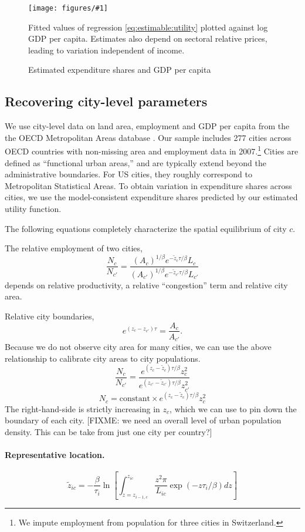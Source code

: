 \documentclass[12pt]{article}
\newcommand{\dofigure}[3]{\begin{figure}
\begin{centering}
\texttt{[image: figures/\#1]}
  \caption{#2\label{fig:#1}}
\end{centering}

\noindent \footnotesize{#3}
\end{figure}}
\begin{document}
\dofigure{city_level_inputs/expenditure_shares}{Estimated expenditure shares and GDP per capita}{Fitted values of regression \eqref{eq:estimable:utility} plotted against log GDP per capita. Estimates also depend on sectoral relative prices, leading to variation independent of income.}

\subsection{Recovering city-level parameters}
We use city-level data on land area, employment and GDP per capita from the the OECD Metropolitan Areas database \cite{oecd}. Our sample includes 277 cities across OECD countries with non-missing area and employment data in 2007.\footnote{We impute employment from population for three cities in Switzerland.} Cities are defined as ``functional urban areas,'' and are typically extend beyond the administrative boundaries. For US cities, they roughly correspond to Metropolitan Statistical Areas. To obtain variation in expenditure shares across cities, we use the model-consistent expenditure shares predicted by our estimated utility function.

The following equations completely characterize the spatial equilibrium of city $c$.



The relative employment of two cities,
\[
\frac{N_c}{N_{c'}}
= \frac
	 {\left(A_c\right)^{1/\beta} e^{-\tilde z_c{\tau/\beta}} L_{c}}
	 {\left(A_{c'}\right)^{1/\beta} e^{-\tilde z_{c'}{\tau/\beta}} L_{c'}}
\]
depends on relative productivity, a relative ``congestion'' term and relative city area.

Relative city boundaries,
\[
e^{(z_{c}-z_{c'}) \tau} =
\frac {A_c}
	{A_{c'}}.
\]
Because we do not observe city area for many cities, we can use the above relationship to calibrate city areas to city populations.
\[
\frac{N_c}{N_{c'}}
= \frac
	 {e^{(z_c-\tilde z_c){\tau/\beta}} z_{c}^2}
	 {e^{(z_{c'}-\tilde z_{c'}){\tau/\beta}} z_{c'}^2}
\]
\[
{N_c}
= \text{constant} \times {e^{(z_c-\tilde z_c){\tau/\beta}} z_{c}^2}
\]
The right-hand-side is strictly increasing in $z_c$, which we can use to pin down the boundary of each city.
[FIXME: we need an overall level of urban population density. This can be take from just one city per country?]


\paragraph{Representative location.}
\begin{equation}\label{eq:representative_location}
	\tilde z_{ic}
	=
	- \frac {\beta}{\tau_i}
	\ln
	\left[
	\int_{z=z_{i-1,c}}^{z_{ic}}
		\frac {z^2\pi}{L_{ic}}
		\exp(-z \tau_i/\beta)
		dz
	\right]
\end{equation}
\end{document}
